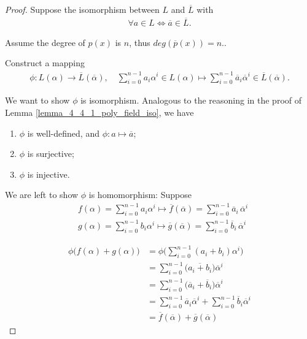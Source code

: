 \documentclass[utf8]{ctexbook}
\theoremstyle{definition}
\begin{document}
\begin{proof}
Suppose the isomorphism between $L$ and $\overline{L}$ with
\begin{align*}
\forall a \in L \iff \overline{a} \in \overline{L} .
\end{align*}

Assume the degree of $p(x)$ is $n$, thus $deg(\overline{p} (x) ) = n$..

Construct a mapping
\begin{align*}
\phi : L(\alpha) \longrightarrow \overline{L} (\overline{\alpha}), \quad \sum_{i=0} ^{n-1} a_i \alpha^i \in L(\alpha) \mapsto \sum_{i=0} ^{n-1} \overline{a}_i \overline{\alpha}^i \in \overline{L} (\overline{\alpha}).
\end{align*}

We want to show $\phi$ is isomorphism. Analogous to the reasoning in the proof of Lemma \ref{lemma_4_4_1_poly_field_iso}, we have
\begin{enumerate}
\item{$\phi$ is well-defined, and $\phi: a \mapsto \overline{a}$;}
\item{$\phi$ is surjective;}
\item{$\phi$ is injective.}
\end{enumerate}

We are left to show $\phi$ is homomorphism: Suppose
\begin{align*}
& f(\alpha) = \sum_{i=0} ^{n-1} a_i \alpha^i  \mapsto \overline{f} ( \overline{\alpha} ) = \sum_{i=0} ^{n-1} \overline{a}_i \, \overline{\alpha}^i \\
& g(\alpha) = \sum_{i=0} ^{n-1} b_i \alpha^i  \mapsto \overline{g} (\overline{\alpha}) = \sum_{i=0} ^{n-1} \overline{b}_i \, \overline{\alpha}^i  
\end{align*}

\begin{align*}
\phi \big(f( \alpha ) + g( \alpha) \big) &= \phi\big( \sum_{i=0} ^{n-1} (a_i + b_i) \alpha^i   \big) \\
&= \sum_{i=0} ^{n-1}\big( \overline{a_i + b_i} \big) \overline{\alpha}^i \\
&=  \sum_{i=0} ^{n-1} \big( \overline{a}_i + \overline{b}_i \big) \overline{\alpha}^i \\
&= \sum_{i=0} ^{n-1} \overline{a}_i \overline{\alpha}^i + \sum_{i=0} ^{n-1} \overline{b}_i \overline{\alpha}^i  \\
&= \overline{f} (\overline{\alpha} ) + \overline{g} ( \overline{\alpha})
\end{align*} 


\end{proof}
\end{document}
